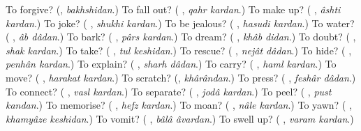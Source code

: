 \begin{tcolorbox}[breakable,colback=teal!4,colframe=teal!35!black,title={Before you move on}]
To forgive? (\textbf{}, \emph{bakhshidan}.) To fall out? (\textbf{ }, \emph{qahr kardan}.) To make up? (\textbf{ }, \emph{âshti kardan}.) To joke? (\textbf{ }, \emph{shukhi kardan}.) To be jealous? (\textbf{ }, \emph{hasudi kardan}.) To water? (\textbf{ }, \emph{âb dâdan}.) To bark? (\textbf{ }, \emph{pârs kardan}.) To dream? (\textbf{ }, \emph{khâb didan}.) To doubt? (\textbf{ }, \emph{shak kardan}.) To take? (\textbf{ }, \emph{tul keshidan}.) To rescue? (\textbf{ }, \emph{nejât dâdan}.) To hide? (\textbf{ }, \emph{penhân kardan}.) To explain? (\textbf{ }, \emph{sharh dâdan}.) To carry? (\textbf{ }, \emph{haml kardan}.) To move? (\textbf{ }, \emph{harakat kardan}.) To scratch? (\textbf{}, \emph{khârândan}.) To press? (\textbf{ }, \emph{feshâr dâdan}.) To connect? (\textbf{ }, \emph{vasl kardan}.) To separate? (\textbf{ }, \emph{jodâ kardan}.) To peel? (\textbf{ }, \emph{pust kandan}.) To memorise? (\textbf{ }, \emph{hefz kardan}.) To moan? (\textbf{ }, \emph{nâle kardan}.) To yawn? (\textbf{ }, \emph{khamyâze keshidan}.) To vomit? (\textbf{ }, \emph{bâlâ âvardan}.) To swell up? (\textbf{ }, \emph{varam kardan}.)
\end{tcolorbox}
